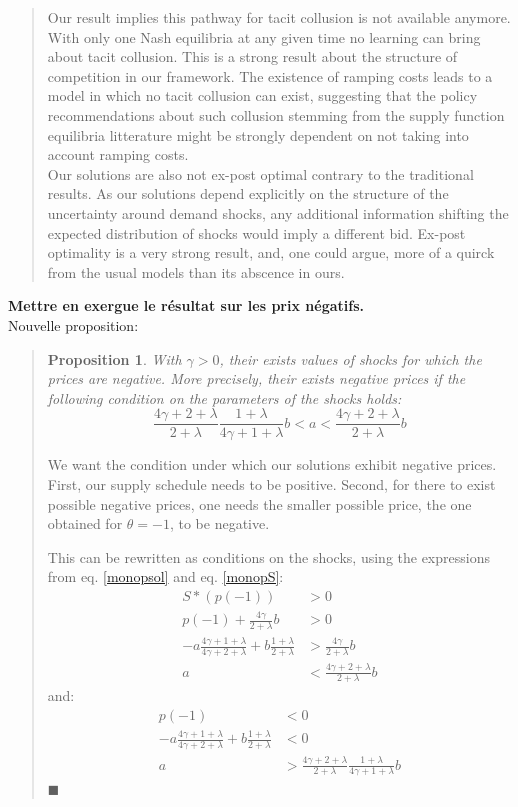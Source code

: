 \documentclass{article}
\newtheorem{proposition}[theorem]{Proposition}
\newenvironment{proof}[1][Proof]{\begin{trivlist}
\item[\hskip \labelsep {\bfseries #1}]}{\end{trivlist}}
\newcommand{\qed}{$\blacksquare$}
\begin{document}
\begin{itemize}
\begin{quote}
Our result implies this pathway for tacit collusion is not available anymore. With only one Nash equilibria at any given time no learning can bring about tacit collusion. This is a strong result about the structure of competition in our framework. The existence of ramping costs leads to a model in which no tacit collusion can exist, suggesting that the policy recommendations about such collusion stemming from the supply function equilibria litterature might be strongly dependent on not taking into account ramping costs.\\

Our solutions are also not ex-post optimal contrary to the traditional results. As our solutions depend explicitly on the structure of the uncertainty around demand shocks, any additional information shifting the expected distribution of shocks would imply a different bid. Ex-post optimality is a very strong result, and, one could argue, more of a quirck from the usual models than its abscence in ours.
\end{quote}

\item \textbf{Mettre en exergue le résultat sur les prix négatifs.}\\

Nouvelle proposition:

\begin{quote}
\begin{proposition}
With $\gamma > 0 $, their exists values of shocks for which the prices are negative. More precisely, their exists negative prices if the following condition on the parameters of the shocks holds:
$$\frac{4\gamma+2+\lambda}{2+\lambda}\frac{1+\lambda}{4\gamma+1+\lambda}b<a<\frac{4\gamma+2+\lambda}{2+\lambda}b$$
\end{proposition}

\begin{proof}
We want the condition under which our solutions exhibit negative prices. First, our supply schedule needs to be positive. Second, for there to exist possible negative prices, one needs the smaller possible price, the one obtained for $\theta=-1$, to be negative.

This can be rewritten as conditions on the shocks, using the expressions from eq. \ref{monopsol} and eq. \ref{monopS}:
\begin{align*}
S*(p(-1))&>0\\
p(-1)+\frac{4\gamma}{2+\lambda}b&>0\\
-a\frac{4\gamma+1+\lambda}{4\gamma+2+\lambda}+ b\frac{1+\lambda}{2+\lambda}&>\frac{4\gamma}{2+\lambda}b\\
a&<\frac{4\gamma+2+\lambda}{2+\lambda}b
\end{align*}
and:
\begin{align*}
p(-1)&<0\\
-a\frac{4\gamma+1+\lambda}{4\gamma+2+\lambda}+ b\frac{1+\lambda}{2+\lambda}&<0\\
a&>\frac{4\gamma+2+\lambda}{2+\lambda}\frac{1+\lambda}{4\gamma+1+\lambda}b
\end{align*} \qed
\end{proof} 
\end{quote}


\end{itemize}
\end{document}
